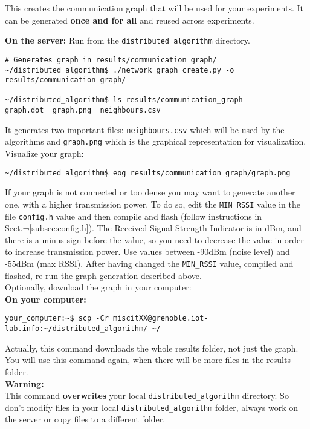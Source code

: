 \documentclass[oneside]{article}
\begin{document}
This creates the communication graph that
will be used for your experiments. It can be generated \textbf{once and for all} and
reused across experiments.

\textbf{On the server:}
Run from the \verb=distributed_algorithm= directory.

\begin{verbatim}# Generates graph in results/communication_graph/
~/distributed_algorithm$ ./network_graph_create.py -o results/communication_graph/

~/distributed_algorithm$ ls results/communication_graph
graph.dot  graph.png  neighbours.csv \end{verbatim}

It generates two important files:
\texttt{neighbours.csv} which will be used by the algorithms and
\texttt{graph.png} which is the graphical representation for visualization.\\

Visualize your graph:
\begin{verbatim}
~/distributed_algorithm$ eog results/communication_graph/graph.png
\end{verbatim}

If your graph is not connected or too dense you may want to generate another one,
with a higher transmission power. To do so, edit the \verb=MIN_RSSI= value in the file
 \verb=config.h= value and then compile and flash
(follow instructions in Sect.¬\ref{subsec:config.h}).
The Received Signal Strength Indicator is in dBm, 
and there is a minus sign before the value,
so you need to decrease the value in order to increase transmission power.
Use values between -90dBm (noise level) and -55dBm (max RSSI).
After having changed the \verb=MIN_RSSI= value, compiled and flashed, re-run the graph generation described above.\\

Optionally, download the graph in your computer:\\
\textbf{On your computer:} 
\begin{verbatim}
your_computer:~$ scp -Cr miscitXX@grenoble.iot-lab.info:~/distributed_algorithm/ ~/
\end{verbatim}
Actually, this command downloads the whole results folder, not just the graph. You will use this command again, when there will be more files in the results folder.\\
\textbf{Warning:} \\ This command \textbf{overwrites} your local \verb=distributed_algorithm= directory.  So don't modify files in your local \verb=distributed_algorithm= folder, always work on the server or copy files to a different folder.
\end{document}
